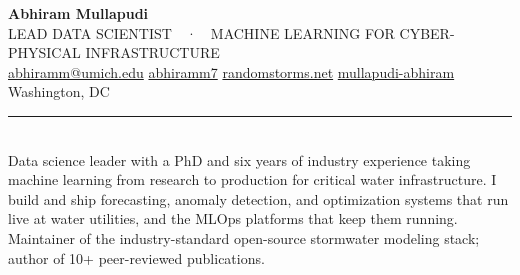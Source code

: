 \documentclass{article}
\begin{document}
\color{ink}
\setlength{\parindent}{0pt}

{\fontsize{26}{30}\selectfont\headfont\bfseries Abhiram Mullapudi}\\[0.5em]
{\metafont\small\textcolor{slate}{LEAD DATA SCIENTIST~~·~~MACHINE LEARNING FOR CYBER-PHYSICAL INFRASTRUCTURE}}\\[0.7em]
{\footnotesize
{\color{cardinal}\faEnvelope}\hspace{0.4em}\href{mailto:abhiramm@umich.edu}{abhiramm@umich.edu}\hspace{1.1em}
{\color{cardinal}\faGithub}\hspace{0.4em}\href{https://github.com/abhiramm7}{abhiramm7}\hspace{1.1em}
{\color{cardinal}\faGlobe}\hspace{0.4em}\href{https://randomstorms.net}{randomstorms.net}\hspace{1.1em}
{\color{cardinal}\faLinkedin}\hspace{0.4em}\href{https://www.linkedin.com/in/mullapudi-abhiram/}{mullapudi-abhiram}\hspace{1.1em}
{\color{cardinal}\faMapMarker}\hspace{0.4em}Washington, DC}\\[0.8em]
{\color{hairline}\rule{\textwidth}{0.8pt}}\\[0.4em]

{\small Data science leader with a PhD and six years of industry experience taking machine learning from research to production for critical water infrastructure. I build and ship forecasting, anomaly detection, and optimization systems that run live at water utilities, and the MLOps platforms that keep them running. Maintainer of the industry-standard open-source stormwater modeling stack; author of 10+ peer-reviewed publications.}
\end{document}
